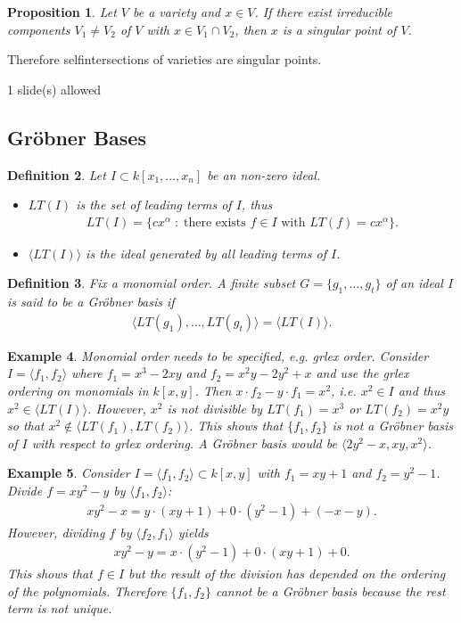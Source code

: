 \documentclass[11pt,a4paper,english]{scrartcl}
\newtheorem{defn}{Definition}
\newtheorem{prop}[defn]{Proposition}
\newtheorem{ex}[defn]{Example}
\newcommand{\mvar}[2]{#1_1,\ldots , #1_{#2}}
\newcommand{\kxn}{k[\mvar{x}{n}]}
\newcommand{\needSlides}[1]{\newpage \begin{needSl}#1 slide(s) allowed\end{needSl}}
\begin{document}
\begin{prop}
Let $V$ be a variety and $x\in V$. If there exist irreducible components $V_1 \neq V_2$ of $V$ with $x\in V_1 \cap V_2$, then $x$ is a singular point of $V$.
\end{prop}
Therefore selfintersections of varieties are singular points.	

\needSlides{1}
\subsection{Gröbner Bases}
\begin{defn}
Let $I \subset \kxn  $ be an non-zero ideal. 
\begin{itemize}
\item $LT(I)$ is the set of leading terms of $I$, thus
\begin{align*}
LT(I) = \{ cx^\alpha \; : \;  \text{there exists } f \in I \text{ with } LT(f) = cx^\alpha \}.
\end{align*}

\item $\langle LT(I) \rangle$ is the ideal generated by all leading terms of $I$.
\end{itemize}
\end{defn}

\begin{defn}
Fix a monomial order. A finite subset $G = \{ \mvar{g}{t} \}$ of an ideal $I$ is said to be a \emph{Gröbner basis} if 
\begin{align*}
\langle LT(g_1), \ldots, LT(g_t) \rangle = \langle LT(I) \rangle .
\end{align*}
\end{defn}

\begin{ex}
\label{exGrbase}
Monomial order needs to be specified, e.g. grlex order.
Consider $I=\langle f_1,f_2 \rangle$ where $f_1=x^3 - 2xy$ and $f_2 = x^2 y -2y^2+x$ and use the grlex ordering on monomials in $k[x,y]$. Then $x\cdot f_2 - y \cdot f_1 = x^2$, i.e. $x^2 \in I$ and thus $x^2 \in \langle LT(I) \rangle$. However, $x^2$ is not divisible by $LT(f_1) = x^3$ or $LT(f_2) = x^2y$ so that $x^2 \notin \langle LT(f_1), LT(f_2) \rangle$. This shows that $\{ f_1,f_2 \}$ is not a Gröbner basis of $I$ with respect to grlex ordering. A Gröbner basis would be $\langle 2 y^2 -x, xy, x^2 \rangle$. 
\end{ex}

\begin{ex}
Consider $I = \langle f_1,f_2 \rangle \subset k[x,y]$ with $f_1 = xy+1$ and $f_2 = y^2 -1$. Divide $f = xy^2-y$ by $\langle f_1, f_2 \rangle$:
\begin{align*}
xy^2-x = y \cdot (xy+1) + 0 \cdot (y^2-1) + (-x-y).
\end{align*}
However, dividing $f$ by $\langle f_2 , f_1 \rangle$ yields
\begin{align*}
xy^2-y = x \cdot (y^2-1) + 0\cdot (xy+1) +0.
\end{align*}
This shows that $f \in I$ but the result of the division has depended on the ordering of the polynomials. Therefore $\{f_1,f_2\}$ cannot be a Gröbner basis because the rest term is not unique.
\end{ex}
\end{document}
